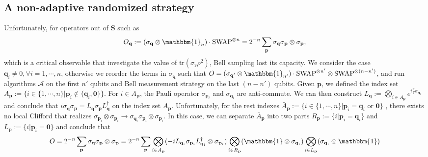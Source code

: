 \documentclass[aps,%
twocolumn,%
floatfix,%
pra,%
amsfonts,%
groupedaddress,%
superscriptaddress]{revtex4-2}%
\newcommand{\1}{\mathbbm{1}}
\begin{document}
\subsection{A non-adaptive randomized strategy}
Unfortunately, for operators out of $\mathbf{S}$ such as
\begin{align}
    O_{\mathbf{q}}:=(\sigma_{\mathbf{q}} \otimes \1_n) \cdot \mathrm{SWAP}^{\otimes n}=2^{-n}\sum_{\mathbf{p}}\sigma_{\mathbf{q}}\sigma_{\mathbf{p}} \otimes \sigma_{\mathbf{p}},
\end{align}
which is a critical observable that investigate the value of $\mathrm{tr}(\sigma_{\mathbf{r}}\rho^2)$, Bell sampling lost its capacity.
We consider the case $\mathbf{q}_i \neq 0, \forall i = 1,\cdots,n$, otherwise we reorder the terms in $\sigma_{\mathbf{q}}$ such that $O = (\sigma_{\mathbf{q}'} \otimes \1_{n'}) \cdot \mathrm{SWAP}^{\otimes n'} \otimes \mathrm{SWAP}^{\otimes (n -n')} $, and run algorithms $\mathcal{A}$ on the first $n'$ qubits and Bell measurement strategy on the last $(n-n')$ qubits.
Given $\mathbf{p}$, we defined the index set $ A_{\mathbf{p}}:=\{i\in \{1,\cdots,n\}|\mathbf{p}_i \notin \{\mathbf{q}_i,\mathbf{0}\}\}$. For $i\in A_{\mathbf{p}}$, the Pauli operator $\sigma_{\mathbf{p}_i}$ and $\sigma_{\mathbf{q}_i}$ are anti-commute. 
We can then construct $L_\mathbf{q}:= \bigotimes_{i\in A_{\mathbf{p}}} e^{i\frac{\pi}{4} \sigma_{\mathbf{q}_i}} $ and conclude that $ i\sigma_{\mathbf{q}} \sigma_{\mathbf{p}} =L_\mathbf{q}\sigma_{\mathbf{p}}L_\mathbf{q}^\dagger$ on the index set $A_{\mathbf{p}}$.
Unfortunately, for the rest indexes  $\bar{A}_{\mathbf{p}}:= \{i \in \{1,\cdots,n\}| \mathbf{p}_i=\mathbf{q}_i\text{~or~} \mathbf{0}\}$ ,  there exists no local Clifford that realizes $\sigma_{\mathbf{p}_i} \otimes \sigma_{\mathbf{p}_i} \to \sigma_{\mathbf{q}_i}\sigma_{\mathbf{p}_i} \otimes \sigma_{\mathbf{p}_i}$. 
In this case, we can separate $\bar{A}_{\mathbf{p}}$ into two parts $R_{\mathbf{p}}:=\{i| \mathbf{p}_i = \mathbf{q}_i\}$ and $L_{\mathbf{p}}:=\{i| \mathbf{p}_i = \mathbf{0}\}$ and conclude that
\begin{align}
\label{eq:2rep_decomp_Prho2}
    O = 2^{-n}\sum_{\mathbf{p}}\sigma_{\mathbf{q}}\sigma_{\mathbf{p}} \otimes \sigma_{\mathbf{p}}= 2^{-n}\sum_{\mathbf{p}} \bigotimes_{i \in A_{\mathbf{p}}} (-iL_{\mathbf{q}_i} \sigma_{\mathbf{p}_i}L_{\mathbf{q}_i}^{\dagger} \otimes \sigma_{\mathbf{p}_i}) \bigotimes_{i \in R_{\mathbf{p}}} (\1 \otimes \sigma_{\mathbf{q}_i}) \bigotimes_{i \in L_{\mathbf{p}}} (\sigma_{\mathbf{q}_i} \otimes \1)
\end{align}
\end{document}
